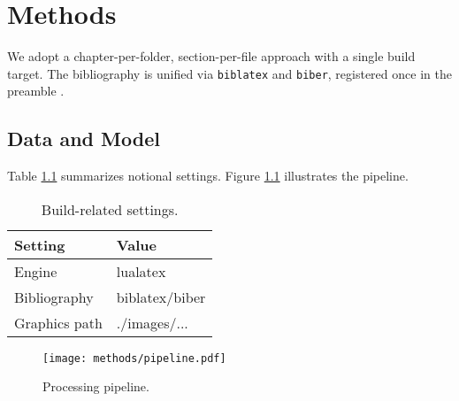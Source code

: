 \documentclass[../../main.tex]{subfiles}
\begin{document}
\chapter{Methods}
We adopt a chapter-per-folder, section-per-file approach with a single build target. The bibliography is unified via \texttt{biblatex} and \texttt{biber}, registered once in the preamble \parencite{lehman2015biblatex}. 

\section{Data and Model}
Table \ref{tab:settings} summarizes notional settings. Figure \ref{fig:methods-pipeline} illustrates the pipeline.

\begin{table}[ht]
  \centering
  \begin{tabular}{@{}ll@{}}
  \toprule
  Setting & Value \\
  \midrule
  Engine & lualatex \\
  Bibliography & biblatex/biber \\
  Graphics path & ./images/... \\
  \bottomrule
  \end{tabular}
  \caption{Build-related settings.}
  \label{tab:settings}
\end{table}

\begin{figure}[ht]
  \centering
  \texttt{[image: methods/pipeline.pdf]}
  \caption{Processing pipeline.}
  \label{fig:methods-pipeline}
\end{figure}
\end{document}
